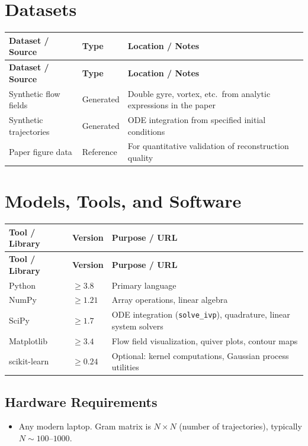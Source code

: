 \documentclass[11pt,a4paper]{article}
\begin{document}
\section{Datasets}

\begin{longtable}{p{4.5cm} p{3.5cm} p{6cm}}
\toprule
\textbf{Dataset / Source} & \textbf{Type} & \textbf{Location / Notes} \\
\midrule
\endfirsthead
\toprule
\textbf{Dataset / Source} & \textbf{Type} & \textbf{Location / Notes} \\
\midrule
\endhead
Synthetic flow fields & Generated & Double gyre, vortex, etc.\ from analytic expressions in the paper \\
\midrule
Synthetic trajectories & Generated & ODE integration from specified initial conditions \\
\midrule
Paper figure data & Reference & For quantitative validation of reconstruction quality \\
\bottomrule
\end{longtable}

\section{Models, Tools, and Software}

\begin{longtable}{p{4.5cm} p{2.5cm} p{6.5cm}}
\toprule
\textbf{Tool / Library} & \textbf{Version} & \textbf{Purpose / URL} \\
\midrule
\endfirsthead
\toprule
\textbf{Tool / Library} & \textbf{Version} & \textbf{Purpose / URL} \\
\midrule
\endhead
Python & $\geq 3.8$ & Primary language \\
\midrule
NumPy & $\geq 1.21$ & Array operations, linear algebra \\
\midrule
SciPy & $\geq 1.7$ & ODE integration (\texttt{solve\_ivp}), quadrature, linear system solvers \\
\midrule
Matplotlib & $\geq 3.4$ & Flow field visualization, quiver plots, contour maps \\
\midrule
scikit-learn & $\geq 0.24$ & Optional: kernel computations, Gaussian process utilities \\
\bottomrule
\end{longtable}

\subsection{Hardware Requirements}
\begin{itemize}
  \item Any modern laptop. Gram matrix is $N \times N$ (number of trajectories), typically $N \sim 100$--$1000$.
\end{itemize}
\end{document}
